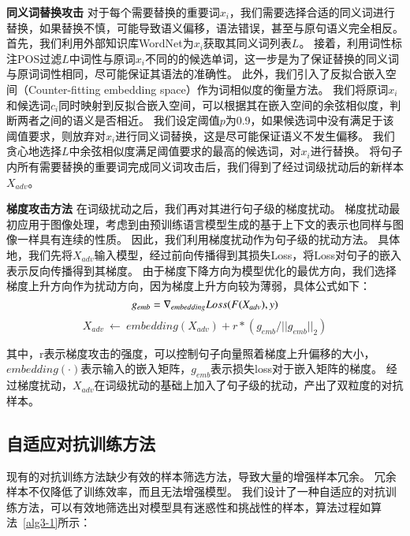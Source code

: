 \textbf{同义词替换攻击} \quad 对于每个需要替换的重要词$x_i$，我们需要选择合适的同义词进行替换，如果替换不慎，可能导致语义偏移，语法错误，甚至与原句语义完全相反。
首先，我们利用外部知识库WordNet\cite{miller1995wordnet}为$x_i$获取其同义词列表$L$。
接着，利用词性标注POS过滤$L$中词性与原词$x_i$不同的的候选单词，这一步是为了保证替换的同义词与原词词性相同，尽可能保证其语法的准确性。
此外，我们引入了反拟合嵌入空间（Counter-fitting embedding space）\cite{mrkvsic2016counte}作为词相似度的衡量方法。
我们将原词$x_i$和候选词$c_i$同时映射到反拟合嵌入空间，可以根据其在嵌入空间的余弦相似度，判断两者之间的语义是否相近。
我们设定阈值$p$为0.9，如果候选词中没有满足于该阈值要求，则放弃对$x_i$进行同义词替换，这是尽可能保证语义不发生偏移。
我们贪心地选择$L$中余弦相似度满足阈值要求的最高的候选词，对$x_i$进行替换。
将句子内所有需要替换的重要词完成同义词攻击后，我们得到了经过词级扰动后的新样本$X_{adv}$。

\textbf{梯度攻击方法} \quad 在词级扰动之后，我们再对其进行句子级的梯度扰动。
梯度扰动最初应用于图像处理\cite{chakraborty2018adversarial}，考虑到由预训练语言模型生成的基于上下文的表示也同样与图像一样具有连续的性质。
因此，我们利用梯度扰动作为句子级的扰动方法。
具体地，我们先将$X_{adv}$输入模型，经过前向传播得到其损失Loss，将Loss对句子的嵌入表示反向传播得到其梯度。
由于梯度下降方向为模型优化的最优方向，我们选择梯度上升方向作为扰动方向，因为梯度上升方向较为薄弱，具体公式如下：
\begin{equation}
    g_{emb} = \nabla_{embedding}Loss(F(X_{adv}), y) \\
\end{equation}
\vspace{-30pt}
\begin{equation}
    X_{adv}\ \leftarrow \ embedding(X_{adv}) + r*(g_{emb}/||g_{emb}||_2)
\end{equation}

其中，r表示梯度攻击的强度，可以控制句子向量照着梯度上升偏移的大小，$embedding(\cdot)$表示输入的嵌入矩阵，$g_{emb}$表示损失loss对于嵌入矩阵的梯度。
经过梯度扰动，$X_{adv}$在词级扰动的基础上加入了句子级的扰动，产出了双粒度的对抗样本。

\subsection{自适应对抗训练方法}

现有的对抗训练方法缺少有效的样本筛选方法，导致大量的增强样本冗余。
冗余样本不仅降低了训练效率，而且无法增强模型。 
我们设计了一种自适应的对抗训练方法，可以有效地筛选出对模型具有迷惑性和挑战性的样本，算法过程如算法~\ref{alg3-1}所示：

